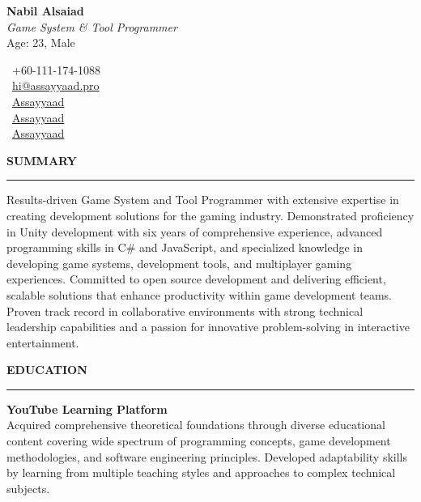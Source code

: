 \documentclass[a4paper,10pt]{article}
\newcommand{\sectionheading}[1]{%
  \addvspace{\medskipamount}%
  {\large\bfseries\MakeUppercase{#1}} %
  \noindent\rule{\linewidth}{0.4pt}%
  \vspace{\smallskipamount}%
}
\begin{document}
\begin{minipage}[t]{0.55\textwidth}
    \vspace{0pt} %
    {\Large\bfseries Nabil Alsaiad}\\[4pt]
    \textit{Game System \& Tool Programmer}\\[4pt]
    Age: 23, Male
\end{minipage}%
\hfill %
\begin{minipage}[t]{0.4\textwidth}
    \vspace{0pt} %
    \raggedleft %
    \faPhone\ +60-111-174-1088 \\[4pt]
    \faEnvelope\ \href{mailto:hi@assayyaad.pro}{hi@assayyaad.pro} \\[4pt]
    \faGitlab\ \href{https://gitlab.com/Assayyaad}{Assayyaad} \\[4pt]
    \faGithub\ \href{https://github.com/Assayyaad}{Assayyaad} \\[4pt]
    \faLinkedin\ \href{https://linkedin.com/in/Assayyaad}{Assayyaad}
\end{minipage}

\sectionheading{Summary}
Results-driven Game System and Tool Programmer with extensive expertise in creating development solutions for the gaming industry. Demonstrated proficiency in Unity development with six years of comprehensive experience, advanced programming skills in C\# and JavaScript, and specialized knowledge in developing game systems, development tools, and multiplayer gaming experiences. Committed to open source development and delivering efficient, scalable solutions that enhance productivity within game development teams. Proven track record in collaborative environments with strong technical leadership capabilities and a passion for innovative problem-solving in interactive entertainment.

\sectionheading{Education}

\textbf{YouTube Learning Platform}\\
Acquired comprehensive theoretical foundations through diverse educational content covering wide spectrum of programming concepts, game development methodologies, and software engineering principles. Developed adaptability skills by learning from multiple teaching styles and approaches to complex technical subjects.
\end{document}

